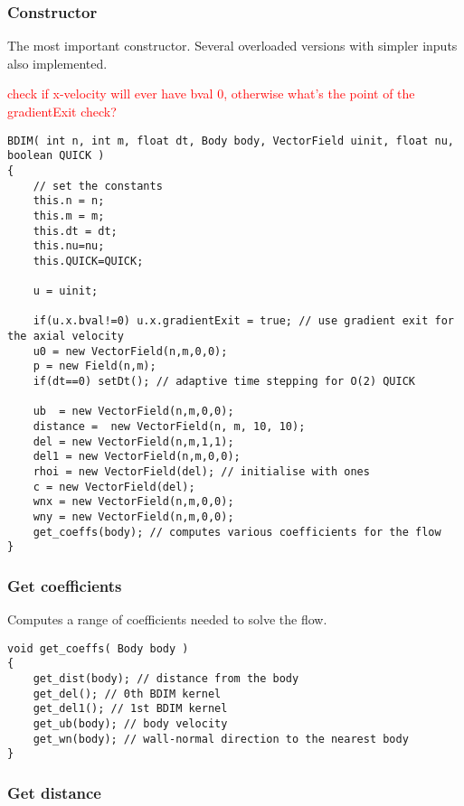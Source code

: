 \documentclass[notitlepage]{article}
\begin{document}
\subsubsection{Constructor}

The most important constructor. Several overloaded versions with simpler inputs also implemented.

\textcolor{red}{check if x-velocity will ever have bval 0, otherwise what's the point of the gradientExit check?}

\begin{lstlisting}[style=myCpp]
BDIM( int n, int m, float dt, Body body, VectorField uinit, float nu, boolean QUICK )
{
	// set the constants
	this.n = n;
	this.m = m;
	this.dt = dt;
	this.nu=nu;
	this.QUICK=QUICK;

	u = uinit;
	
	if(u.x.bval!=0) u.x.gradientExit = true; // use gradient exit for the axial velocity
	u0 = new VectorField(n,m,0,0);
	p = new Field(n,m);
	if(dt==0) setDt(); // adaptive time stepping for O(2) QUICK

	ub  = new VectorField(n,m,0,0);
	distance =  new VectorField(n, m, 10, 10);    
	del = new VectorField(n,m,1,1);
	del1 = new VectorField(n,m,0,0);
	rhoi = new VectorField(del); // initialise with ones
	c = new VectorField(del);
	wnx = new VectorField(n,m,0,0);
	wny = new VectorField(n,m,0,0);
	get_coeffs(body); // computes various coefficients for the flow
}
\end{lstlisting}

\subsubsection{Get coefficients}

Computes a range of coefficients needed to solve the flow.

\begin{lstlisting}[style=myCpp]
void get_coeffs( Body body )
{
	get_dist(body); // distance from the body
	get_del(); // 0th BDIM kernel
	get_del1(); // 1st BDIM kernel
	get_ub(body); // body velocity
	get_wn(body); // wall-normal direction to the nearest body
}
\end{lstlisting}

\subsubsection{Get distance}
\end{document}
